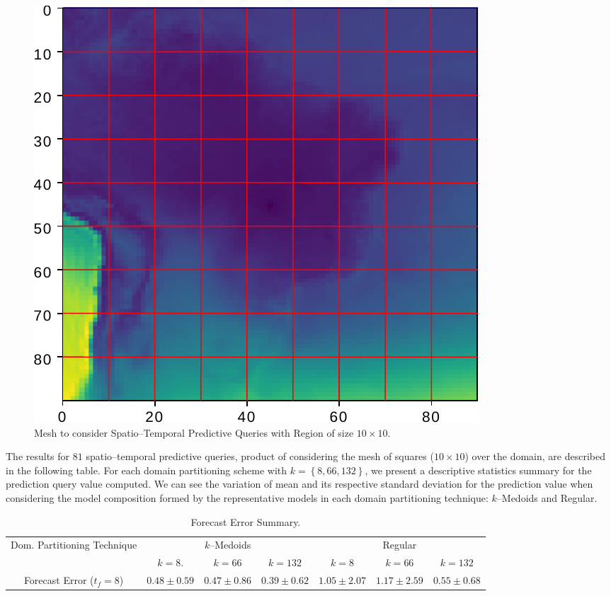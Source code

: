 \begin{figure}[h]
	\centering
	\includegraphics[scale=0.75]{../Figures/query_10x10_whole_real_brazil}
	\caption{Mesh to consider Spatio--Temporal Predictive Queries with Region of size $10 \times 10$.}
	\label{Fig:Query_10x10_whole_real_brazil}
\end{figure}

The results for $81$ spatio--temporal predictive queries, product of considering the mesh of squares ($10 \times 10$) over the domain, are described in the following table. For each domain partitioning scheme with $k = \left\{8, 66, 132 \right\}$, we present a descriptive statistics summary for the prediction query value computed. We can see the variation of mean and its respective standard deviation for the prediction value when considering the model composition formed by the representative models in each domain partitioning technique: $k$--Medoids and Regular.

\begin{table}[h!]
	\centering
	\tiny
	\begin{tabular}{|c|c|c|c|c|c|c|}
		\hline
		\multirow{2}{*}{Dom. Partitioning Technique} & \multicolumn{3}{c|}{$k$--Medoids} & \multicolumn{3}{c|}{Regular} \\
		\cline{2-7}
		& $k = 8$. & $k = 66$ & $k = 132$ & $k = 8$ & $k = 66$ & $k = 132$ \\
		\cline{2-7}
		\hline
		Forecast Error ($t_{f}=8$) & $0.48 \pm 0.59$ & $0.47 \pm 0.86$ & $0.39 \pm 0.62$ & $1.05 \pm 2.07$ & $1.17 \pm 2.59$ & $0.55 \pm 0.68$	 \\
		\hline
	\end{tabular}
	\caption{Forecast Error Summary.}
	\label{Table:Query10x10_kMedoids_Regular_StatSummary}
\end{table}


